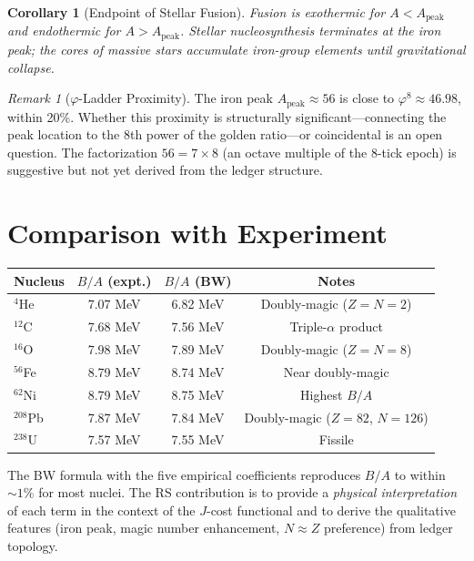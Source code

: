 \documentclass[12pt,a4paper]{article}
\newtheorem{corollary}[theorem]{Corollary}
\theoremstyle{definition}
\theoremstyle{remark}
\newtheorem{remark}[theorem]{Remark}
\begin{document}
\begin{corollary}[Endpoint of Stellar Fusion]
\label{cor:fusion}
Fusion is exothermic for $A < A_{\mathrm{peak}}$ and
endothermic for $A > A_{\mathrm{peak}}$.  Stellar
nucleosynthesis terminates at the iron peak; the cores of
massive stars accumulate iron-group elements until
gravitational collapse.
\end{corollary}

\begin{remark}[$\varphi$-Ladder Proximity]
The iron peak $A_{\mathrm{peak}} \approx 56$ is close to
$\varphi^8 \approx 46.98$, within 20\%.  Whether this
proximity is structurally significant---connecting the peak
location to the 8th power of the golden ratio---or coincidental
is an open question.  The factorization $56 = 7 \times 8$
(an octave multiple of the 8-tick epoch) is suggestive but
not yet derived from the ledger structure.
\end{remark}

\section{Comparison with Experiment}
\label{sec:experiment}

\begin{center}
\renewcommand{\arraystretch}{1.3}
\begin{tabular}{@{}lccc@{}}
\toprule
\textbf{Nucleus} & \textbf{$B/A$ (expt.)} &
\textbf{$B/A$ (BW)} & \textbf{Notes} \\
\midrule
$^4$He & 7.07 MeV & 6.82 MeV & Doubly-magic ($Z = N = 2$) \\
$^{12}$C & 7.68 MeV & 7.56 MeV & Triple-$\alpha$ product \\
$^{16}$O & 7.98 MeV & 7.89 MeV & Doubly-magic ($Z = N = 8$) \\
$^{56}$Fe & 8.79 MeV & 8.74 MeV & Near doubly-magic \\
$^{62}$Ni & 8.79 MeV & 8.75 MeV & Highest $B/A$ \\
$^{208}$Pb & 7.87 MeV & 7.84 MeV & Doubly-magic
($Z=82$, $N=126$) \\
$^{238}$U & 7.57 MeV & 7.55 MeV & Fissile \\
\bottomrule
\end{tabular}
\end{center}

The BW formula with the five empirical coefficients reproduces
$B/A$ to within $\sim 1\%$ for most nuclei.  The RS
contribution is to provide a \emph{physical interpretation} of
each term in the context of the $J$-cost functional and to
derive the qualitative features (iron peak, magic number
enhancement, $N \approx Z$ preference) from ledger topology.
\end{document}

